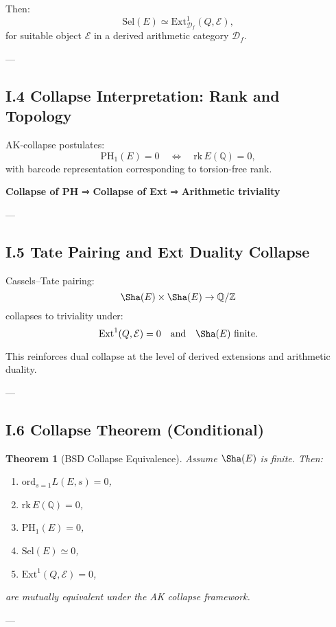 \documentclass[11pt]{article}
\newtheorem{theorem}{Theorem}[section]
\begin{document}
Then:
\[
\mathrm{Sel}(E) \simeq \mathrm{Ext}^1_{\mathcal{D}_f}(Q, \mathcal{E}),
\]
for suitable object $\mathcal{E}$ in a derived arithmetic category $\mathcal{D}_f$.

---

\subsection*{I.4 Collapse Interpretation: Rank and Topology}

AK-collapse postulates:
\[
\mathrm{PH}_1(E) = 0 \quad \Leftrightarrow \quad \mathrm{rk}\,E(\mathbb{Q}) = 0,
\]
with barcode representation corresponding to torsion-free rank.

\textbf{Collapse of PH} ⇒ \textbf{Collapse of Ext} ⇒ \textbf{Arithmetic triviality}

---

\subsection*{I.5 Tate Pairing and Ext Duality Collapse}

Cassels–Tate pairing:
\[
\Sha(E) \times \Sha(E) \to \mathbb{Q}/\mathbb{Z}
\]
collapses to triviality under:
\[
\mathrm{Ext}^1(Q, \mathcal{E}) = 0 \quad \text{and} \quad \Sha(E) \text{ finite}.
\]

This reinforces dual collapse at the level of derived extensions and arithmetic duality.

---

\subsection*{I.6 Collapse Theorem (Conditional)}

\begin{theorem}[BSD Collapse Equivalence]
Assume $\Sha(E)$ is finite. Then:
\begin{enumerate}
  \item $\mathrm{ord}_{s=1} L(E,s) = 0$,
  \item $\mathrm{rk}\,E(\mathbb{Q}) = 0$,
  \item $\mathrm{PH}_1(E) = 0$,
  \item $\mathrm{Sel}(E) \simeq 0$,
  \item $\mathrm{Ext}^1(Q, \mathcal{E}) = 0$,
\end{enumerate}
are mutually equivalent under the AK collapse framework.
\end{theorem}

---
\end{document}
